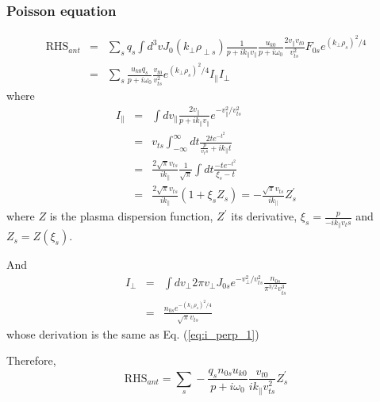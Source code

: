 \documentclass[12pt]{article}
\begin{document}
\subsubsection{Poisson equation}
%
\begin{eqnarray}
\mathrm{RHS}_{ant} &=& \sum_s q_s \int d^3 v J_0(k_\perp \rho_{\perp s}) \frac{1}{p + ik_\parallel v_\parallel} \frac{u_{k0}}{p + i \omega_0} \frac{2 v_\parallel v_{t0}}{v_{ts}^2} F_{0s} e^{(k_\perp \rho_s)^2 / 4} \nonumber \\
&=& \sum_s \frac{u_{k0} q_s}{p + i \omega_0} \frac{v_{t0}}{v_{ts}^2} e^{(k_\perp \rho_s)^2 / 4} I_\parallel I_\perp
\end{eqnarray}
where
%
\begin{eqnarray}
I _\parallel &=& \int d v_\parallel  \frac{2 v_\parallel}{p + i k _\parallel v_\parallel} e^{-v_\parallel^2/v_{ts}^2} \nonumber \\
&=& v_{ts} \int_{-\infty}^{\infty} dt \frac{2t e^{-t^2}}{\frac{p}{v_ts} + ik_\parallel t} \nonumber \\
&=& \frac{2\sqrt{\pi} v_{ts}}{ik_\parallel} \frac{1}{\sqrt{\pi}}\int dt \frac{-te^{-t^2}}{\xi_s - t} \nonumber \\
&=&  \frac{2\sqrt{\pi} v_{ts}}{ik_\parallel} (1 + \xi_s Z_s) = -\frac{\sqrt{\pi} v_{ts}}{ik_\parallel} Z^\prime_s
\label{eq:i_par_1}
\end{eqnarray}
where $Z$ is the plasma dispersion function, $Z^\prime$ its derivative, $\xi_s = \frac{p}{-ik_\parallel v_ts}$ and $Z_s = Z(\xi_s)$.

And 
\begin{eqnarray}
I_\perp &=& \int dv_\perp 2\pi v_\perp J_{0s} e^{-v_\perp^2/v_{ts}^2}\frac{n_{0s}}{\pi^{3/2}v_{ts}^3} \nonumber \\
&=& \frac{n_{0s} e^{-(k_\perp \rho_s)^2/4}}{\sqrt{\pi} v_{ts}}
\label{eq:i_perp_2}
\end{eqnarray}
whose derivation is the same as Eq. (\ref{eq:i_perp_1})

Therefore, 
\begin{equation}
\mathrm{RHS}_{ant} = \sum_s  - \frac{q_s n_{0s} u_{k0}}{p + i \omega_0} \frac{v_{t0}}{ik_\parallel v_{ts}^2} Z^\prime_s
\end{equation}
\end{document}
